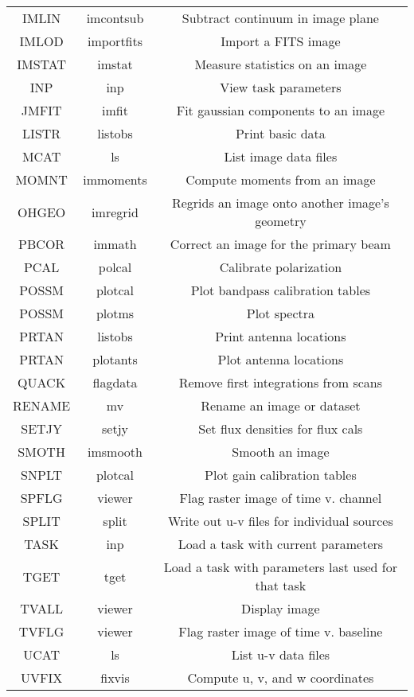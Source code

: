 \begin{table}[ht]
\begin{center}
\begin{tabular}{|c|c|c|}
IMLIN 	 & imcontsub 	 & Subtract continuum in image plane\\
IMLOD 	 & importfits 	 & Import a FITS image\\
IMSTAT 	 & imstat   	 & Measure statistics on an image\\
INP 	 & inp     	 & View task parameters\\
JMFIT 	 & imfit    	 & Fit gaussian components to an image\\
LISTR 	 & listobs 	 & Print basic data\\
MCAT 	 & ls 	         & List image data files\\
MOMNT 	 & immoments 	 & Compute moments from an image\\
OHGEO 	 & imregrid 	 & Regrids an image onto another image's geometry\\
PBCOR 	 & immath   	 & Correct an image for the primary beam\\
PCAL 	 & polcal 	         & Calibrate polarization\\
POSSM 	 & plotcal 	 & Plot bandpass calibration tables\\
POSSM 	 & plotms    	 & Plot spectra\\
PRTAN 	 & listobs 	 & Print antenna locations\\
PRTAN 	 & plotants 	 & Plot antenna locations\\
QUACK 	 & flagdata 	 & Remove first integrations from scans\\
RENAME 	 & mv 	         & Rename an image or dataset\\
SETJY 	 & setjy 	         & Set flux densities for flux cals\\
SMOTH 	 & imsmooth 	 & Smooth an image\\
SNPLT 	 & plotcal 	 & Plot gain calibration tables\\
SPFLG 	 & viewer   	 & Flag raster image of time v. channel\\
SPLIT 	 & split    	 & Write out u-v files for individual sources\\
TASK 	 & inp     	 & Load a task with current parameters\\
TGET 	 & tget    	 & Load a task with parameters last used for that task\\
TVALL 	 & viewer  	 & Display image\\
TVFLG 	 & viewer 	         & Flag raster image of time v. baseline\\
UCAT 	 & ls      	 & List u-v data files\\
UVFIX 	 & fixvis  	 & Compute u, v, and w coordinates\\

\end{tabular}
\end{center}
\end{table}
